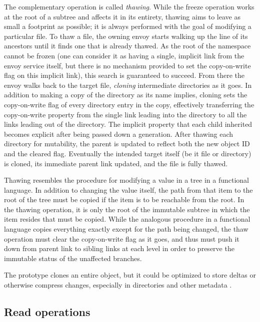 The complementary operation is called \emph{thawing}. While the freeze operation works at the root of a subtree and affects it in its entirety, thawing aims to leave as small a footprint as possible; it is always performed with the goal of modifying a particular file. To thaw a file, the owning envoy starts walking up the line of its ancestors until it finds one that is already thawed. As the root of the namespace cannot be frozen (one can consider it as having a single, implicit link from the envoy service itself, but there is no mechanism provided to set the copy-on-write flag on this implicit link), this search is guaranteed to succeed. From there the envoy walks back to the target file, \emph{cloning} intermediate directories as it goes. In addition to making a copy of the directory as its name implies, cloning sets the copy-on-write flag of every directory entry in the copy, effectively transferring the copy-on-write property from the single link leading into the directory to all the links leading out of the directory. The implicit property that each child inherited becomes explicit after being passed down a generation. After thawing each directory for mutability, the parent is updated to reflect both the new object ID and the cleared flag. Eventually the intended target itself (be it file or directory) is cloned, its immediate parent link updated, and the file is fully thawed.

Thawing resembles the procedure for modifying a value in a tree in a functional language. In addition to changing the value itself, the path from that item to the root of the tree must be copied if the item is to be reachable from the root. In the thawing operation, it is only the root of the immutable subtree in which the item resides that must be copied. While the analogous procedure in a functional language copies everything exactly except for the path being changed, the thaw operation must clear the copy-on-write flag as it goes, and thus must push it down from parent link to sibling links at each level in order to preserve the immutable status of the unaffected branches.

The prototype clones an entire object, but it could be optimized to store deltas or otherwise compress changes, especially in directories and other metadata \cite{soules}.

\subsection{Read operations}

